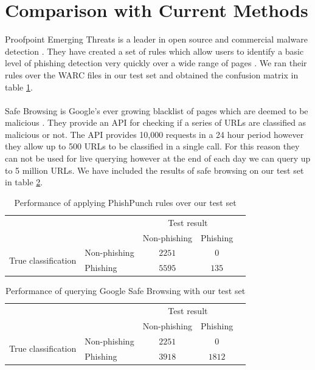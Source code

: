 \documentclass[12pt,twoside]{report}
\begin{document}
\section{Comparison with Current Methods}
Proofpoint Emerging Threats is a leader in open source and commercial malware detection \cite{emergingthreats}. They have created a set of rules which allow users to identify a basic level of phishing detection very quickly over a wide range of pages \cite{phishpunch}. We ran their rules over the WARC files in our test set and obtained the confusion matrix in table \ref{table:etconfusionmatrix}.
\\\\
Safe Browsing is Google's ever growing blacklist of pages which are deemed to be malicious \cite{safebrowsing}. They provide an API for checking if a series of URLs are classified as malicious or not. The API provides 10,000 requests in a 24 hour period however they allow up to 500 URLs to be classified in a single call. For this reason they can not be used for live querying however at the end of each day we can query up to 5 million URLs. We have included the results of safe browsing on our test set in table \ref{table:safebrowsingconfusionmatrix}.
\begin{table}[h]
\begin{center}
\begin{tabular}{l|l|c|c|c}
\multicolumn{2}{c}{}&\multicolumn{2}{c}{Test result}&\\
\cline{3-4}
\multicolumn{2}{c|}{}&Non-phishing&Phishing\\
\cline{2-4}
\multirow{2}{*}{True classification}& Non-phishing & $2251$ & $0$\\
\cline{2-4}
& Phishing & $5595$ & $135$\\
\cline{2-4}
\end{tabular}
\end{center}
\caption{Performance of applying PhishPunch rules over our test set \cite{phishpunch}}
\label{table:etconfusionmatrix}
\end{table}
\clearpage
\begin{table}[h]
\begin{center}
\begin{tabular}{l|l|c|c|c}
\multicolumn{2}{c}{}&\multicolumn{2}{c}{Test result}&\\
\cline{3-4}
\multicolumn{2}{c|}{}&Non-phishing&Phishing\\
\cline{2-4}
\multirow{2}{*}{True classification}& Non-phishing & $2251$ & $0$\\
\cline{2-4}
& Phishing & $3918$ & $1812$\\
\cline{2-4}
\end{tabular}
\end{center}
\caption{Performance of querying Google Safe Browsing with our test set \cite{safebrowsing}}
\label{table:safebrowsingconfusionmatrix}
\end{table}
\end{document}
